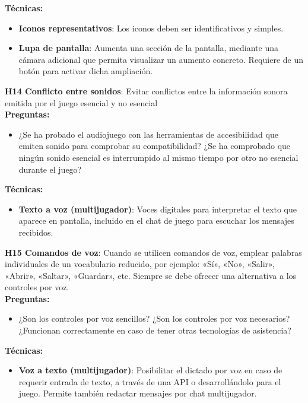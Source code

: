 \textbf{Técnicas:}
\begin{itemize}
	\item \textbf{Iconos representativos}: Los iconos deben ser identificativos y simples. \cite{LibroBlancoAccesibilidad}
	\item \textbf{Lupa de pantalla}: Aumenta una sección de la pantalla, mediante una cámara adicional que permita visualizar un aumento concreto. Requiere de un botón para activar dicha ampliación. \cite{LibroBlancoAccesibilidad} 
\end{itemize}
\textbf{H14 Conflicto entre sonidos}: Evitar conflictos entre la información sonora emitida por el juego esencial y no esencial \cite{EN301549-2021} \cite{teixeiraborgesFairPlayGuidelines2018a}\\
\textbf{Preguntas:}
\begin{itemize}
	\item ¿Se ha probado el audiojuego con las herramientas de accesibilidad que emiten sonido para comprobar su compatibilidad? ¿Se ha comprobado que ningún sonido esencial es interrumpido al mismo tiempo por otro no esencial durante el juego?
\end{itemize}
\textbf{Técnicas:}
\begin{itemize}
	\item \textbf{Texto a voz (multijugador)}: Voces digitales para interpretar el texto que aparece en pantalla, incluido en el chat de juego para escuchar los mensajes recibidos.  \cite{LibroBlancoAccesibilidad} 
\end{itemize}
\textbf{H15 Comandos de voz}: Cuando se utilicen comandos de voz, emplear palabras individuales de un vocabulario reducido, por ejemplo: «Sí», «No», «Salir», «Abrir», «Saltar», «Guardar», etc. Siempre se debe ofrecer una alternativa a los controles por voz. \cite{EN301549-2021} \cite{teixeiraborgesFairPlayGuidelines2018a}\\
\textbf{Preguntas:}
\begin{itemize}
	\item ¿Son los controles por voz sencillos? ¿Son los controles por voz necesarios? ¿Funcionan correctamente en caso de tener otras tecnologías de asistencia? 
\end{itemize}
\textbf{Técnicas:}
\begin{itemize}
	\item \textbf{Voz a texto (multijugador)}: Posibilitar el dictado por voz en caso de requerir entrada de texto, a través de una API o desarrollándolo para el juego. Permite también redactar mensajes por chat multijugador. \cite{LibroBlancoAccesibilidad}
\end{itemize}
